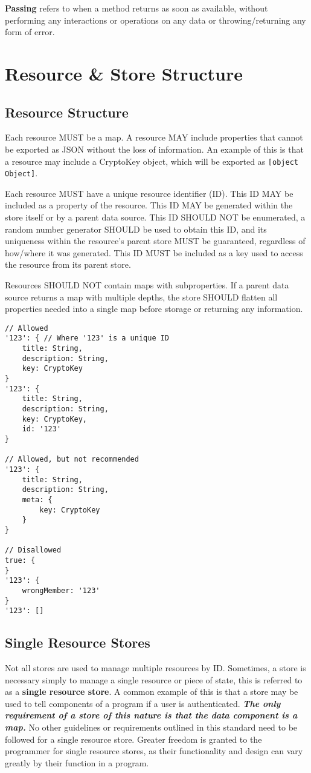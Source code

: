 \documentclass{article}
\begin{document}
\textbf{Passing} refers to when a method returns as soon as available, without performing any interactions or operations on any data or throwing/returning any form of error.

\section{Resource \& Store Structure}

\subsection{Resource Structure}
Each resource MUST be a map. A resource MAY include properties that cannot be exported as JSON without the loss of information. An example of this is that a resource may include a CryptoKey object, which will be exported as \verb|[object Object]|.

Each resource MUST have a unique resource identifier (ID). This ID MAY be included as a property of the resource. This ID MAY be generated within the store itself or by a parent data source. This ID SHOULD NOT be enumerated, a random number generator SHOULD be used to obtain this ID, and its uniqueness within the resource's parent store MUST be guaranteed, regardless of how/where it was generated. This ID MUST be included as a key used to access the resource from its parent store.

Resources SHOULD NOT contain maps with subproperties. If a parent data source returns a map with multiple depths, the store SHOULD flatten all properties needed into a single map before storage or returning any information.

\begin{lstlisting}[caption=Valid Resource Structure]
// Allowed
'123': { // Where '123' is a unique ID
    title: String,
    description: String,
    key: CryptoKey
}
'123': {
    title: String,
    description: String,
    key: CryptoKey,
    id: '123'
}

// Allowed, but not recommended
'123': {
    title: String,
    description: String,
    meta: {
        key: CryptoKey
    }
}

// Disallowed
true: {
}
'123': {
    wrongMember: '123'
}
'123': []
\end{lstlisting}

\subsection{Single Resource Stores}
Not all stores are used to manage multiple resources by ID. Sometimes, a store is necessary simply to manage a single resource or piece of state, this is referred to as a \textbf{single resource store}. A common example of this is that a store may be used to tell components of a program if a user is authenticated. \textbf{\textit{The only requirement of a store of this nature is that the data component is a map.}} No other guidelines or requirements outlined in this standard need to be followed for a single resource store. Greater freedom is granted to the programmer for single resource stores, as their functionality and design can vary greatly by their function in a program.
\end{document}

